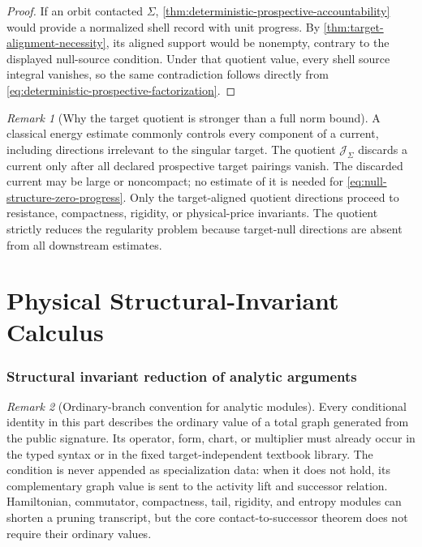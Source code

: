 \documentclass[11pt]{article}
\numberwithin{section}{part}
\theoremstyle{plain}
\theoremstyle{definition}
\theoremstyle{remark}
\newtheorem{remark}[remark]{Remark}
\begin{document}
\begin{proof}
If an orbit contacted \(\Sigma\),
\cref{thm:deterministic-prospective-accountability} would provide a normalized
shell record with unit progress.  By
\cref{thm:target-alignment-necessity}, its aligned support would be nonempty,
contrary to the displayed null-source condition.  Under that quotient value, every
shell source integral vanishes, so the same contradiction follows directly
from \eqref{eq:deterministic-prospective-factorization}.
\end{proof}

\begin{remark}[Why the target quotient is stronger than a full norm bound]
A classical energy estimate commonly controls every component of a current,
including directions irrelevant to the singular target.  The quotient
\(\mathscr J_\Sigma\) discards a current only after all declared prospective
target pairings vanish.  The discarded current may be large or noncompact;
no estimate of it is needed for \eqref{eq:null-structure-zero-progress}.
Only the target-aligned quotient directions proceed to resistance,
compactness, rigidity, or physical-price invariants.  The quotient strictly
reduces the regularity problem because target-null directions are absent from
all downstream estimates.
\end{remark}

\part{Physical Structural-Invariant Calculus}
\label{part:invariant-calculus}

\section{Structural invariant reduction of analytic arguments}
\label{sec:structural-invariant-reduction}

\begin{remark}[Ordinary-branch convention for analytic modules]
Every conditional identity in this part describes the ordinary value of a
total graph generated from the public signature.  Its operator, form, chart,
or multiplier must already occur in the typed syntax or in the fixed
target-independent textbook library.  The condition is never appended as
specialization data: when it does not hold, its complementary graph value is
sent to the activity lift and successor relation.  Hamiltonian, commutator,
compactness, tail, rigidity, and entropy modules can shorten a pruning
transcript, but the core contact-to-successor theorem does not require their
ordinary values.
\end{remark}
\end{document}

